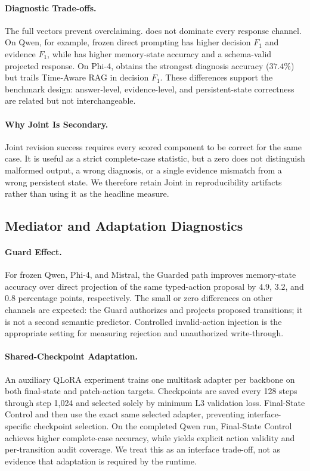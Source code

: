 \paragraph{Diagnostic Trade-offs.}
The full vectors prevent overclaiming. \method{} does not dominate every response channel. On Qwen, for example, frozen direct prompting has higher decision $F_1$ and evidence $F_1$, while \method{} has higher memory-state accuracy and a schema-valid projected response. On Phi-4, \method{} obtains the strongest diagnosis accuracy ($37.4\%$) but trails Time-Aware RAG in decision $F_1$. These differences support the benchmark design: answer-level, evidence-level, and persistent-state correctness are related but not interchangeable.

\paragraph{Why Joint Is Secondary.}
Joint revision success requires every scored component to be correct for the same case. It is useful as a strict complete-case statistic, but a zero does not distinguish malformed output, a wrong diagnosis, or a single evidence mismatch from a wrong persistent state. We therefore retain Joint in reproducibility artifacts rather than using it as the headline measure.

\subsection{Mediator and Adaptation Diagnostics}

\paragraph{Guard Effect.}
For frozen Qwen, Phi-4, and Mistral, the Guarded path improves memory-state accuracy over direct projection of the same typed-action proposal by $4.9$, $3.2$, and $0.8$ percentage points, respectively. The small or zero differences on other channels are expected: the Guard authorizes and projects proposed transitions; it is not a second semantic predictor. Controlled invalid-action injection is the appropriate setting for measuring rejection and unauthorized write-through.

\paragraph{Shared-Checkpoint Adaptation.}
An auxiliary QLoRA experiment trains one multitask adapter per backbone on both final-state and patch-action targets. Checkpoints are saved every 128 steps through step 1,024 and selected solely by minimum L3 validation loss. Final-State Control and \method{} then use the exact same selected adapter, preventing interface-specific checkpoint selection. On the completed Qwen run, Final-State Control achieves higher complete-case accuracy, while \method{} yields explicit action validity and per-transition audit coverage. We treat this as an interface trade-off, not as evidence that adaptation is required by the runtime.

